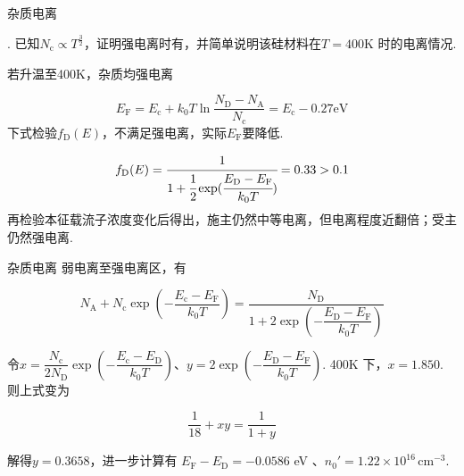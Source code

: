 \documentclass{beamer}
\begin{document}
\begin{frame}[t]{杂质电离}

    {. 已知$N_\text{c}\propto T^{\frac{3}{2}}$，证明强电离时有{}，并简单说明该硅材料在$T=400$K 时的电离情况.\par
    }
    \vspace{0.1cm}
    \qquad 若升温至400K，杂质均强电离\par
    \vspace{-0.2cm}
    \[
        E_\text{F}= E_\text{c} + k_0 T \ln \dfrac{N_\text{D}-N_\text{A}}{N_\text{c}} = E_\text{c} - 0.27 \text{eV}
    \]
    下式检验$f_\text{D}(E)$，不满足强电离，实际$E_\text{F}$要降低.\par
    \vspace{-0.2cm}
    \[
        f_\text{D}(E) = \cfrac{1}{1+\cfrac{1}{2}\exp(\cfrac{E_\text{D}-E_\text{F}}{k_0 T})} = 0.33 > 0.1
    \]
    \qquad 再检验本征载流子浓度变化后得出，施主仍然中等电离，但电离程度近翻倍；受主仍然强电离.
    
\end{frame}

\begin{frame}[t]{杂质电离}
    \qquad 弱电离至强电离区，有\par
    \vspace{-0.2cm}
    \[
        N_\text{A} + N_\text{c}\exp (-\dfrac{E_\text{c}-E_\text{F}}{k_0 T}) = \dfrac{N_\text{D}}{1 + 2\exp (-\dfrac{E_\text{D}-E_\text{F}}{k_0 T})}
    \]
    \par
    \vspace{-0.15cm}
    
    \qquad 令$x = \dfrac{N_\text{c}}{2 N_\text{D}} \exp (-\dfrac{E_\text{c}-E_\text{D}}{k_0 T})$、$y = 2 \exp (-\dfrac{E_\text{D}-E_\text{F}}{k_0 T})$. 400K 下，$x = 1.850$. 则上式变为\par
    
    \[
        \dfrac{1}{18} + xy = \dfrac{1}{1+y}
    \]
    \par
    
    \vspace{-0.15cm}
    
    解得$y = 0.3658 $，进一步计算有 $E_\text{F} - E_\text{D} = -0.0586$ eV 、$n_0'=1.22 \times 10^{16}\, \text{cm}^{-3}$.
    
\end{frame}
\end{document}

